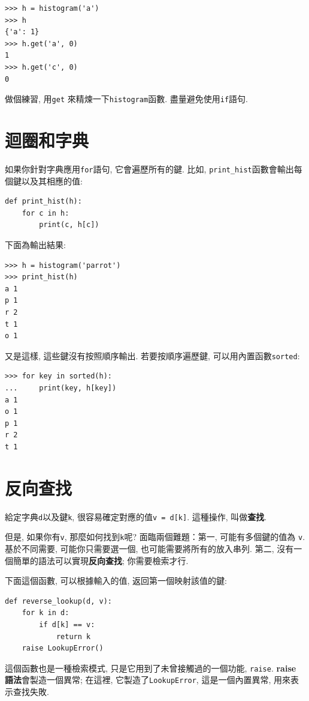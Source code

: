 \documentclass[10pt]{book}
\begin{document}
\begin{verbatim}
>>> h = histogram('a')
>>> h
{'a': 1}
>>> h.get('a', 0)
1
>>> h.get('c', 0)
0
\end{verbatim}
%
做個練習, 用{\tt get} 來精煉一下{\tt histogram}函數. 
盡量避免使用{\tt if}語句. 

\section{迴圈和字典}

如果你針對字典應用{\tt for}語句, 它會遍歷所有的鍵. 
比如, \verb"print_hist"函數會輸出每個鍵以及其相應的值:

\begin{verbatim}
def print_hist(h):
    for c in h:
        print(c, h[c])
\end{verbatim}
%
下面為輸出結果:

\begin{verbatim}
>>> h = histogram('parrot')
>>> print_hist(h)
a 1
p 1
r 2
t 1
o 1
\end{verbatim}
%
又是這樣, 這些鍵沒有按照順序輸出. 
若要按順序遍歷鍵, 可以用內置函數{\tt sorted}:

\begin{verbatim}
>>> for key in sorted(h):
...     print(key, h[key])
a 1
o 1
p 1
r 2
t 1
\end{verbatim}



\section{反向查找}
\label{raise}

給定字典{\tt d}以及鍵{\tt k}, 很容易確定對應的值{\tt v = d[k]}. 
這種操作, 叫做{\bf 查找}.

但是, 如果你有{\tt v}, 那麼如何找到{\tt k}呢?
面臨兩個難題：第一, 可能有多個鍵的值為 {\tt v}. 
基於不同需要, 可能你只需要選一個, 也可能需要將所有的放入串列. 
第二, 沒有一個簡單的語法可以實現{\bf 反向查找}; 你需要檢索才行.

下面這個函數, 可以根據輸入的值, 返回第一個映射該值的鍵:

\begin{verbatim}
def reverse_lookup(d, v):
    for k in d:
        if d[k] == v:
            return k
    raise LookupError()
\end{verbatim}
%
這個函數也是一種檢索模式, 只是它用到了未曾接觸過的一個功能, {\tt raise}. 
{\bf raise 語法}會製造一個異常;
在這裡, 它製造了{\tt LookupError}, 這是一個內置異常, 用來表示查找失敗. 
  
 
\end{document}
